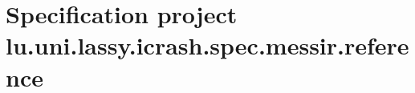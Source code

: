 \chapter{Specification project lu.uni.lassy.icrash.spec.messir.reference}

\label{chap:lu.uni.lassy.icrash.spec.messir.reference-lu.uni.lassy.icrash.spec.messir.reference}








